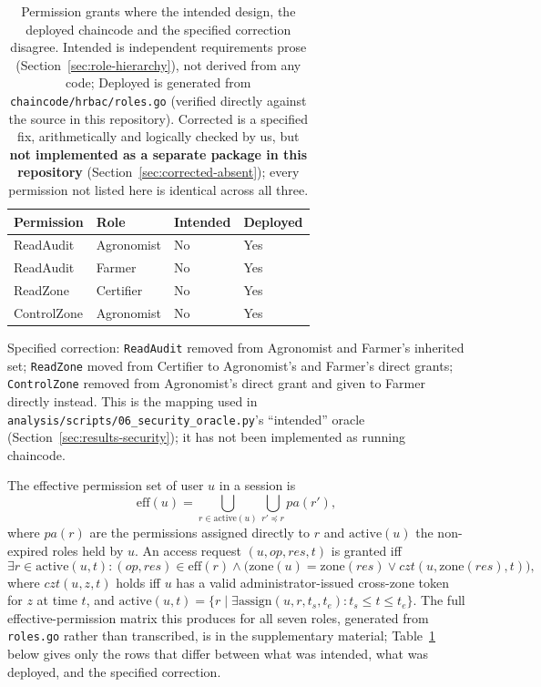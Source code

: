 \begin{table}[H]
\centering
\caption{Permission grants where the intended design, the deployed chaincode and the specified correction disagree. Intended is independent requirements prose (Section~\ref{sec:role-hierarchy}), not derived from any code; Deployed is generated from \texttt{chaincode/hrbac/roles.go} (verified directly against the source in this repository). Corrected is a specified fix, arithmetically and logically checked by us, but \textbf{not implemented as a separate package in this repository} (Section~\ref{sec:corrected-absent}); every permission not listed here is identical across all three.}
\label{tab:policy-table}
\small
\begin{tabular}{llll}
\toprule
Permission & Role & Intended & Deployed \\
\midrule
ReadAudit & Agronomist & No & Yes \\
ReadAudit & Farmer & No & Yes \\
ReadZone & Certifier & No & Yes \\
ControlZone & Agronomist & No & Yes \\
\bottomrule
\end{tabular}

\smallskip
\footnotesize Specified correction: \texttt{ReadAudit} removed from Agronomist and Farmer's inherited set; \texttt{ReadZone} moved from Certifier to Agronomist's and Farmer's direct grants; \texttt{ControlZone} removed from Agronomist's direct grant and given to Farmer directly instead. This is the mapping used in \texttt{analysis/scripts/06\_security\_oracle.py}'s ``intended'' oracle (Section~\ref{sec:results-security}); it has not been implemented as running chaincode.
\end{table}

The effective permission set of user $u$ in a session is
\begin{equation}
\mathrm{eff}(u) = \bigcup_{r \in \mathrm{active}(u)} \bigcup_{r' \preceq r} pa(r'),
\end{equation}
where $pa(r)$ are the permissions assigned directly to $r$ and $\mathrm{active}(u)$ the non-expired roles held by $u$. An access request $(u, op, res, t)$ is granted iff
\begin{equation}
\exists r \in \mathrm{active}(u,t): (op,res) \in \mathrm{eff}(r) \wedge \big(\mathrm{zone}(u) = \mathrm{zone}(res) \vee czt(u,\mathrm{zone}(res),t)\big),
\end{equation}
where $czt(u,z,t)$ holds iff $u$ has a valid administrator-issued cross-zone token for $z$ at time $t$, and $\mathrm{active}(u,t) = \{r \mid \exists \mathrm{assign}(u,r,t_s,t_e): t_s \le t \le t_e\}$. The full effective-permission matrix this produces for all seven roles, generated from \texttt{roles.go} rather than transcribed, is in the supplementary material; Table~\ref{tab:policy-table} below gives only the rows that differ between what was intended, what was deployed, and the specified correction.

